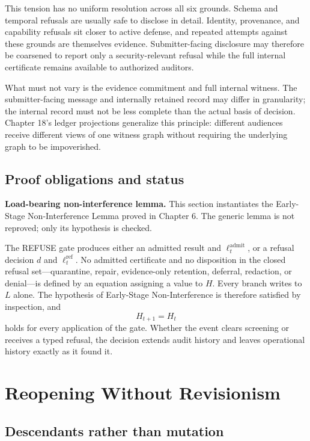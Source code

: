 \documentclass[11pt,openany]{book}
\begin{document}
This tension has no uniform resolution across all six grounds. Schema and
temporal refusals are usually safe to disclose in detail. Identity, provenance,
and capability refusals sit closer to active defense, and repeated attempts
against these grounds are themselves evidence. Submitter-facing disclosure may
therefore be coarsened to report only a security-relevant refusal while the
full internal certificate remains available to authorized auditors.

What must not vary is the evidence commitment and full internal witness. The
submitter-facing message and internally retained record may differ in
granularity; the internal record must not be less complete than the actual
basis of decision. Chapter 18's ledger projections generalize this principle:
different audiences receive different views of one witness graph without
requiring the underlying graph to be impoverished.

\section{Proof obligations and status}

\textbf{Load-bearing non-interference lemma.} This section instantiates the
Early-Stage Non-Interference Lemma proved in Chapter 6. The generic lemma is not
reproved; only its hypothesis is checked.

The REFUSE gate produces either an admitted result and
\(\ell_t^{\mathrm{admit}}\), or a refusal decision \(d\) and
\(\ell_t^{\mathrm{ref}}\). No admitted certificate and no disposition in the
closed refusal set---quarantine, repair, evidence-only retention, deferral,
redaction, or denial---is defined by an equation assigning a value to \(H\).
Every branch writes to \(L\) alone. The hypothesis of Early-Stage
Non-Interference is therefore satisfied by inspection, and
\[
 H_{t+1}=H_t
\]
holds for every application of the gate. Whether the event clears screening or
receives a typed refusal, the decision extends audit history and leaves
operational history exactly as it found it.

\chapter{Reopening Without Revisionism}
\section{Descendants rather than mutation}
\end{document}
